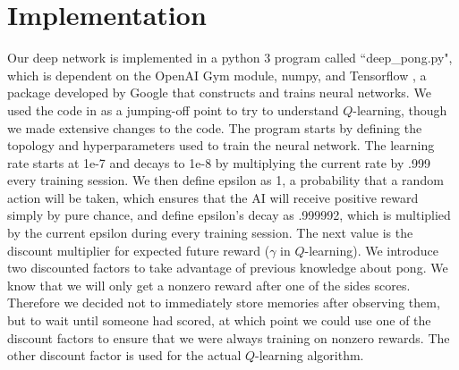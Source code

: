 \documentclass[12pt]{article}
\theoremstyle{plain}
\theoremstyle{definition}
\theoremstyle{remark}
\theoremstyle{plain}
\begin{document}
\section{Implementation}
\par
Our deep network is implemented in a python 3 program called ``deep\_pong.py", which is dependent on the OpenAI Gym module, numpy, and Tensorflow \cite{tensorflow}, a package developed by Google that constructs and trains neural networks.  We used the code in \cite{medium,tutorial} as a jumping-off point to try to understand $Q$-learning, though we made extensive changes to the code. The program starts by defining the topology and hyperparameters used to train the neural network.  The learning rate starts at 1e-7 and decays to 1e-8 by multiplying the current rate by .999 every training session.  We then define epsilon as 1, a probability that a random action will be taken, which ensures that the AI will receive positive reward simply by pure chance, and define epsilon's decay as .999992, which is multiplied by the current epsilon during every training session.  The next value is the discount multiplier for expected future reward ($\gamma$ in $Q$-learning).  We introduce two discounted factors to take advantage of previous knowledge about pong. We know that we will only get a nonzero reward after one of the sides scores. Therefore we decided not to immediately store memories after observing them, but to wait until someone had scored, at which point we could use one of the discount factors to ensure that we were always training on nonzero rewards. The other discount factor is used for the actual $Q$-learning algorithm.
\end{document}

